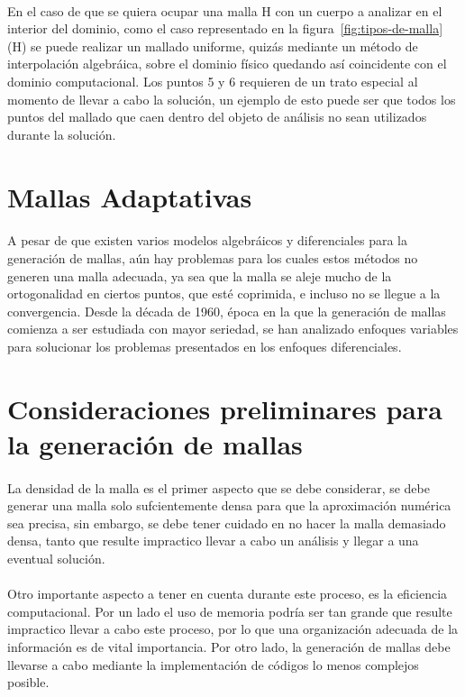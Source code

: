 \documentclass[letterpaper, openright, 12pt]{book}
\begin{document}
    \paragraph*{}
    En el caso de que se quiera ocupar una malla H con un cuerpo a analizar
    en el interior del dominio, como el caso representado en la
    figura~\ref{fig:tipos-de-malla} (H) se puede realizar un mallado uniforme,
    quizás mediante un método de interpolación algebráica, sobre el dominio
    físico quedando así coincidente con el dominio computacional. Los puntos
    5 y 6 requieren de un trato especial al momento de llevar a cabo la
    solución, un ejemplo de esto puede ser que todos los puntos del mallado que
    caen dentro del objeto de análisis no sean utilizados durante la solución.

    \section{Mallas Adaptativas}
    \paragraph*{}
    A pesar de que existen varios modelos algebráicos y diferenciales para
    la generación de mallas, aún hay problemas para los cuales estos métodos
    no generen una malla adecuada, ya sea que la malla se aleje mucho de la
    ortogonalidad en ciertos puntos, que esté coprimida, e incluso no se
    llegue a la convergencia. Desde la década de 1960, época en la que la
    generación de mallas comienza a ser estudiada con mayor seriedad, se han
    analizado enfoques variables para solucionar los problemas presentados
    en los enfoques diferenciales.

    \section{Consideraciones preliminares para la generación de mallas}
    \paragraph*{}
    La densidad de la malla es el primer aspecto que se debe considerar, se
    debe generar una malla solo sufcientemente densa para que la
    aproximación numérica sea precisa, sin embargo, se debe tener cuidado en
    no hacer la malla demasiado densa, tanto que resulte impractico llevar a
    cabo un análisis y llegar a una eventual solución.

    \paragraph*{}
    Otro importante aspecto a tener en cuenta durante este proceso, es la
    eficiencia computacional. Por un lado el uso de memoria podría ser tan
    grande que resulte impractico llevar a cabo este proceso, por lo que una
    organización adecuada de la información es de vital importancia. Por
    otro lado, la generación de mallas debe llevarse a cabo mediante la
    implementación de códigos lo menos complejos posible.
\end{document}
